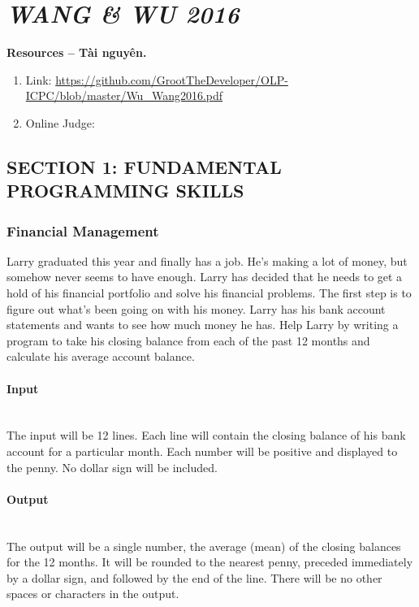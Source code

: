\documentclass{article}
\begin{document}

\section{\it WANG \it\& WU 2016}
\textbf{\textsf{Resources -- Tài nguyên.}}
\begin{enumerate}
\item Link: \url{https://github.com/GrootTheDeveloper/OLP-ICPC/blob/master/Wu_Wang2016.pdf}
\item Online Judge: \url{}
\end{enumerate}


\subsection{SECTION 1: FUNDAMENTAL PROGRAMMING SKILLS}
\subsubsection{Financial Management}
Larry graduated this year and finally has a job. He’s making a lot of money, but somehow never
seems to have enough. Larry has decided that he needs to get a hold of his financial portfolio and
solve his financial problems. The first step is to figure out what’s been going on with his money.
Larry has his bank account statements and wants to see how much money he has. Help Larry by
writing a program to take his closing balance from each of the past 12 months and calculate his
average account balance.

\paragraph{Input} \mbox{} \\

The input will be 12 lines. Each line will contain the closing balance of his bank account for a particular month. Each number will be positive and displayed to the penny. No dollar sign will be included.

\paragraph{Output}\mbox{} \\

The output will be a single number, the average (mean) of the closing balances for the 12 months. It will be rounded to the nearest penny, preceded immediately by a dollar sign, and followed by the end of the line. There will be no other spaces or characters in the output.
\end{document}
